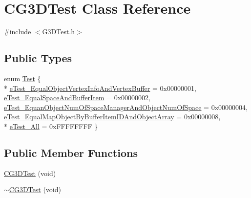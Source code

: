 \hypertarget{class_c_g3_d_test}{}\section{C\+G3\+D\+Test Class Reference}
\label{class_c_g3_d_test}


{\ttfamily \#include $<$G3\+D\+Test.\+h$>$}

\subsection*{Public Types}
\begin{DoxyCompactItemize}
\item 
enum \hyperlink{class_c_g3_d_test_a41271919eb70fb469b62f7c5dd7dbb17}{Test} \{ \\*
\hyperlink{class_c_g3_d_test_a41271919eb70fb469b62f7c5dd7dbb17a0d1a32f7e67dc820410f5771874b9c38}{e\+Test\+\_\+\+Equal\+Object\+Vertex\+Info\+And\+Vertex\+Buffer} = 0x00000001, 
\hyperlink{class_c_g3_d_test_a41271919eb70fb469b62f7c5dd7dbb17a85f818508ac7398ec4857485b39ab556}{e\+Test\+\_\+\+Equal\+Space\+And\+Buffer\+Item} = 0x00000002, 
\hyperlink{class_c_g3_d_test_a41271919eb70fb469b62f7c5dd7dbb17a61b22f265c2e95f53b6fac6f82e5ad4a}{e\+Test\+\_\+\+Equan\+Object\+Num\+Of\+Space\+Manager\+And\+Object\+Num\+Of\+Space} = 0x00000004, 
\hyperlink{class_c_g3_d_test_a41271919eb70fb469b62f7c5dd7dbb17a1c7800bc97b2e8b0df4501a6f99c7d7b}{e\+Test\+\_\+\+Equal\+Map\+Object\+By\+Buffer\+Item\+I\+D\+And\+Object\+Array} = 0x00000008, 
\\*
\hyperlink{class_c_g3_d_test_a41271919eb70fb469b62f7c5dd7dbb17ad5534ce1b04a3127b4e93b39458632b8}{e\+Test\+\_\+\+All} = 0x\+F\+F\+F\+F\+F\+F\+F\+F
 \}
\end{DoxyCompactItemize}
\subsection*{Public Member Functions}
\begin{DoxyCompactItemize}
\item 
\hyperlink{class_c_g3_d_test_a399293d088f2cbd8910950e2432d9595}{C\+G3\+D\+Test} (void)
\item 
\hyperlink{class_c_g3_d_test_a30de7733527df1d8cb8f1d6fba73fbc3}{$\sim$\+C\+G3\+D\+Test} (void)
\end{DoxyCompactItemize}
